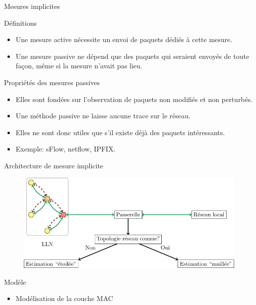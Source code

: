 \begin{frame}{Mesures implicites}
  \begin{block}{Définitions}
    \begin{itemize}
      \item Une mesure active nécessite un envoi de paquets dédiés à cette mesure.
      \item Une mesure passive ne dépend que des paquets qui seraient envoyés de toute façon, même si la mesure n'avait pas lieu.
    \end{itemize}
  \end{block}
  \begin{block}{Propriétés des mesures passives}
    \begin{itemize}
      \item Elles sont fondées sur l'observation de paquets non modifiés et non perturbés.
      \item Une méthode passive ne laisse aucune trace sur le réseau.
      \item Elles ne sont donc utiles que s'il existe déjà des paquets intéressants.
      \item Exemple: sFlow, netflow, IPFIX.
    \end{itemize}

  \end{block}

\end{frame}

\begin{frame}{Architecture de mesure implicite}
  \begin{figure}
    \centering
    \includegraphics[width=\textwidth]{figures/schema_supervision_slides.pdf}
  \end{figure}
  \begin{block}{Modèle}
    \begin{itemize}
      \item Modélisation de la couche MAC
    \end{itemize}
  \end{block}
\end{frame}

